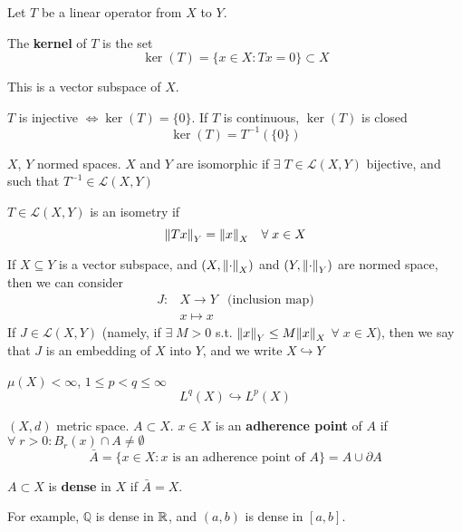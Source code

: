 Let \(T\) be a linear operator from \(X\) to \(Y\).
\begin{definition}
    The \textbf{kernel} of \(T\) is the set 
    \[
        \ker(T) = \{ x \in X: Tx =0\} \subset X
    \]

\end{definition}
This is a vector subspace of \(X\). 

\noindent \(T\) is injective \(\Leftrightarrow \ker (T) = \{0\}\). If \(T\) is continuous, \(\ker(T)\) is closed 
\[
    \ker(T) = T^{-1} (\{0\})
\]
\begin{definition}
    \(X\), \(Y\) normed spaces. \(X\) and \(Y\) are isomorphic if \(\exists \; T \in \mathcal{L}(X, Y)\) bijective, and such that \(T^{-1} \in \mathcal{L}(X, Y)\)
\end{definition}
\begin{definition}
    \(T \in \mathcal{L}(X, Y)\) is an isometry if
    \[
        \norm{Tx}_Y = \norm{x}_X \quad \forall \; x \in X
    \]
\end{definition}
\begin{definition}
    If \(X \subseteq Y\) is a vector subspace, and \(\left(X, \norm{\cdot}_X\right)\) and \(\left(Y, \norm{\cdot}_Y\right)\) are normed space, then we can consider 
    \[
        \begin{array}{rcr}
            J: & X \to Y & \text{(inclusion map)}
            \\ & x \mapsto x
        \end{array}
    \] 
    If \(J \in \mathcal{L}(X, Y)\) (namely, if \(\exists \; M>0 \) s.t. \(\norm{x}_Y \leq M \norm{x}_X\) \(\forall \; x \in X\)), 
    then we say that \(J\) is an embedding of \(X\) into \(Y\), and we write \(X \hookrightarrow Y\)
\end{definition}

\begin{example}
    \(\mu(X) < \infty \), \(1 \leq p < q \leq \infty\)
    \[
        L^q(X) \hookrightarrow L^p(X) \tag*{(inclusion of \(L^p\) spaces)}
    \]
\end{example}

\begin{definition}
    \((X, d)\) metric space. \(A \subset X\). \(x \in X \) is an \textbf{adherence point} of \(A\) if \(\forall \; r>0: B_r(x) \cap A \neq \emptyset\)
    \[
        \bar{A} = \{ x \in X: x \text{ is an adherence point of } A \} = A \cup \partial A
    \]
\end{definition}
\begin{definition}
    \(A \subset X\) is \textbf{dense} in \(X\) if \(\bar{A} = X\).
\end{definition}
For example, \(\mathbb{Q}\) is dense in \(\mathbb{R}\), and \((a, b)\) is dense in \([a, b]\).
